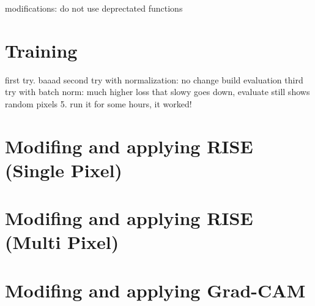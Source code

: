 modifications: do not use deprectated functions

\section{Training}

first try. baaad
second try with normalization: no change
build evaluation
third try with batch norm: much higher loss that slowy goes down, evaluate still shows random pixels
5. run it for some hours, it worked!

\section{Modifing and applying RISE (Single Pixel)}
\section{Modifing and applying RISE (Multi Pixel)}
\section{Modifing and applying Grad-CAM}
